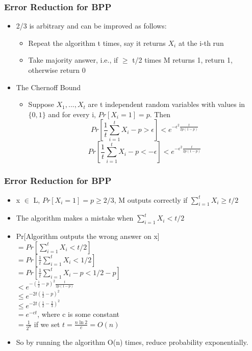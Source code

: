 \documentclass{beamer}
\begin{document}
\begin{frame}
\frametitle{Error Reduction for BPP}
\begin{itemize}
	\item 2/3 is arbitrary and can be improved as follows:
	\begin{itemize}
		\item Repeat the algorithm t times, say it returns $X_{i}$ at the i-th run
		\item Take majority answer, i.e., if $\geq$ t/2 times M returns 1, return 1, otherwise return 0

	\end{itemize}
	\item {\color{red} The Chernoff Bound}
	\begin{itemize}
		\item Suppose $X_{1},...,X_{t}$ are t independent random variables with values in $\{0, 1\}$ and for every i, $Pr[X_{i} = 1] = p$. Then
		$$
		Pr[\frac{1}{t}\sum_{i=1}^{t}X_{i}-p > \epsilon] < e^{-\epsilon^{2}\frac{t}{2p(1-p)}}
		$$
		$$
		Pr[\frac{1}{t}\sum_{i=1}^{t}X_{i}-p < -\epsilon] < e^{-\epsilon^{2}\frac{t}{2p(1-p)}}
		$$
	\end{itemize}
\end{itemize}
\end{frame}
\begin{frame}
\frametitle{Error Reduction for BPP}
\begin{itemize}
	\item x $\in$ L, $Pr[X_{i} = 1] = p \geq 2/3$, M outputs correctly if $\sum_{i=1}^{t}X_{i} \geq t/2$
	\item The algorithm makes a mistake when $\sum_{i=1}^{t}X_{i} < t/2$
	\item Pr[Algorithm outputs the wrong answer on x]\\
	$= Pr[\sum_{i=1}^{t}X_{i} < t/2]$\\
	$= Pr[\frac{1}{t}\sum_{i=1}^{t}X_{i} < 1/2]$\\
	$= Pr[\frac{1}{t}\sum_{i=1}^{t}X_{i}-p < 1/2-p]$\\
	$< e^{-(\frac{1}{2}-p)^{2}\frac{t}{2p(1-p)}}$\\
	$\leq e^{-2t(\frac{1}{2}-p)^{2}}$\\
	$\leq e^{-2t(\frac{1}{2}-\frac{2}{3})^{2}}$\\
	$= e^{-ct}$, where c is some constant\\
	$= \frac{1}{2^{n}}$ if we set $t = \frac{n \ln 2}{c} = O(n)$\\
	\item So by running the algorithm O(n) times, reduce probability exponentially.
\end{itemize}
\end{frame}
\end{document}
